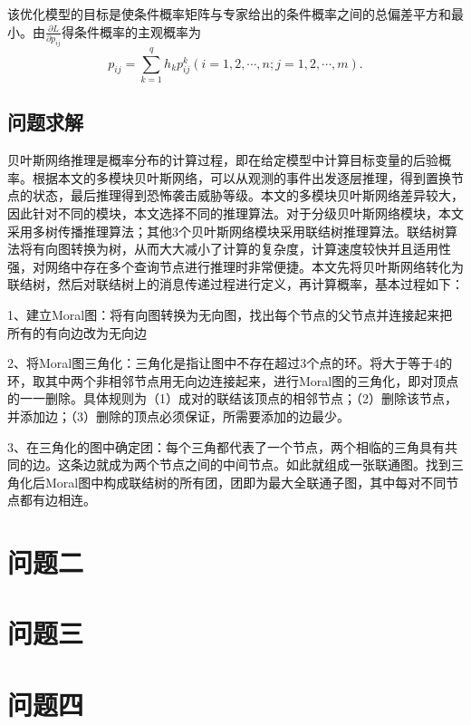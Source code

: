 \documentclass[bwprint]{gmcmthesis}
\begin{document}
该优化模型的目标是使条件概率矩阵与专家给出的条件概率之间的总偏差平方和最小。由$\frac{\partial L}{\partial p_{ij}}$得条件概率的主观概率为
\begin{equation}
	p_{ij}=\sum_{k=1}^{q}h_kp_{ij}^k(i=1,2,\cdots,n;j=1,2,\cdots,m).
\end{equation}
\subsection{问题求解}
贝叶斯网络推理是概率分布的计算过程，即在给定模型中计算目标变量的后验概率。根据本文的多模块贝叶斯网络，可以从观测的事件出发逐层推理，得到置换节点的状态，最后推理得到恐怖袭击威胁等级。本文的多模块贝叶斯网络差异较大，因此针对不同的模块，本文选择不同的推理算法。对于分级贝叶斯网络模块，本文采用多树传播推理算法；其他3个贝叶斯网络模块采用联结树推理算法。联结树算法将有向图转换为树，从而大大减小了计算的复杂度，计算速度较快并且适用性强，对网络中存在多个查询节点进行推理时非常便捷。本文先将贝叶斯网络转化为联结树，然后对联结树上的消息传递过程进行定义，再计算概率，基本过程如下：

1、建立Moral图：将有向图转换为无向图，找出每个节点的父节点并连接起来把所有的有向边改为无向边

2、将Moral图三角化：三角化是指让图中不存在超过3个点的环。将大于等于4的环，取其中两个非相邻节点用无向边连接起来，进行Moral图的三角化，即对顶点的一一删除。具体规则为（1）成对的联结该顶点的相邻节点；（2）删除该节点，并添加边；（3）删除的顶点必须保证，所需要添加的边最少。

3、在三角化的图中确定团：每个三角都代表了一个节点，两个相临的三角具有共同的边。这条边就成为两个节点之间的中间节点。如此就组成一张联通图。找到三角化后Moral图中构成联结树的所有团，团即为最大全联通子图，其中每对不同节点都有边相连。

\section{问题二}
\section{问题三}
\section{问题四}



\end{document}
